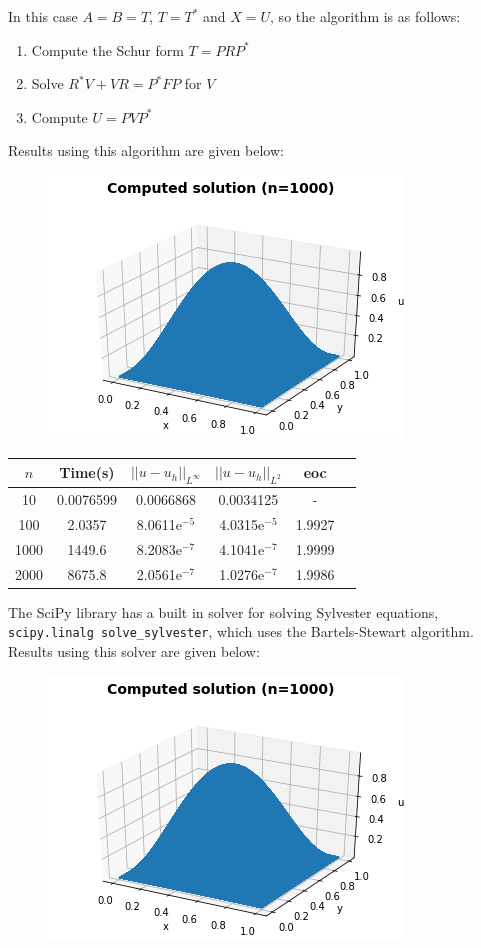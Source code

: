 \documentclass{article}
\numberwithin{equation}{section}
\begin{document}
In this case $A=B=T$, $T=T^*$ and $X=U$, so the algorithm is as follows:
\begin{enumerate}
\item Compute the Schur form $T=PRP^*$
\item Solve $R^*V + VR = P^*FP$ for $V$
\item Compute $U=PVP^*$
\end{enumerate}

Results using this algorithm are given below:

\begin{figure}[H]
\includegraphics[scale=.7]{img/U_bartels.png}
\centering
\end{figure}

\begin{table}[H]
\centering
\begin{tabular}{|c|c|c|c|c|c|}
\hline
$n$ & Time(s) & $|| u - u_h ||_{L^{\infty}}$ &$|| u - u_h ||_{L^{2}}$ & eoc \\
\hline
10 & 0.0076599 & 0.0066868 & 0.0034125 & - \\
100 & 2.0357 & 8.0611e$^{-5}$ & 4.0315e$^{-5}$ & 1.9927 \\
1000 & 1449.6 & 8.2083e$^{-7}$ & 4.1041e$^{-7}$ & 1.9999 \\
2000 & 8675.8 & 2.0561e$^{-7}$ & 1.0276e$^{-7}$ & 1.9986 \\
\hline
\end{tabular}
\end{table}

The SciPy library has a built in solver for solving Sylvester equations, \texttt{scipy.linalg solve\_sylvester}, which uses the Bartels-Stewart algorithm. Results using this solver are given below:

\begin{figure}[H]
\includegraphics[scale=.7]{img/U_scipy.png}
\centering
\end{figure}
\end{document}
